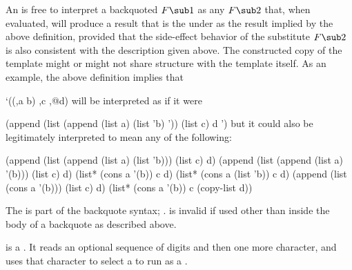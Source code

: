 An  is free to interpret a backquoted  $F\sub 1$
as any  $F\sub 2$ that, when evaluated, will produce a result that is
the  under  as the result implied by the above definition, 
provided that the side-effect behavior of the substitute  $F\sub 2$ 
is also consistent with the description given above.
The constructed
copy of the template might or might not share  structure with the
template itself.  As an example, the above definition implies that

\code
 `((,a b) ,c ,@d)
\endcode
will be interpreted as if it were

\code
 (append (list (append (list a) (list 'b) '\nil)) (list c) d '\nil)
\endcode
but it could also be legitimately interpreted to mean any of the following:

\code
 (append (list (append (list a) (list 'b))) (list c) d)
 (append (list (append (list a) '(b))) (list c) d)
 (list* (cons a '(b)) c d)
 (list* (cons a (list 'b)) c d)
 (append (list (cons a '(b))) (list c) d)
 (list* (cons a '(b)) c (copy-list d))
\endcode
               
\endsubsection%


           
The  is part of the backquote syntax; \seesection\Backquote.
 is invalid if used other than inside the body of a 
backquote  as described above.

\endsubsection%



 is a  .
It reads an optional 
sequence of digits and then one more character,
and uses that character to select a  to run as a
.

